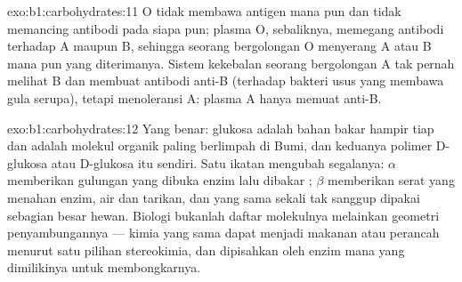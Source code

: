 \begin{solution}{exo:b1:carbohydrates:11}
 O tidak membawa antigen mana pun dan tidak memancing antibodi pada
siapa pun; plasma O, sebaliknya, memegang antibodi terhadap A maupun B,
sehingga seorang bergolongan O menyerang  A atau B mana pun yang
diterimanya. Sistem kekebalan seorang bergolongan A tak pernah melihat B
dan membuat antibodi anti-B (terhadap bakteri usus yang membawa gula
serupa), tetapi menoleransi A: plasma A hanya memuat anti-B.
\end{solution}

\begin{solution}{exo:b1:carbohydrates:12}
Yang benar: glukosa adalah bahan bakar hampir tiap  dan 
adalah molekul organik paling berlimpah di Bumi, dan keduanya polimer
D-glukosa atau D-glukosa itu sendiri. Satu ikatan mengubah segalanya:
$\alpha$ memberikan gulungan yang dibuka enzim lalu dibakar ;
$\beta$ memberikan serat yang menahan enzim, air dan tarikan, dan yang
sama sekali tak sanggup dipakai sebagian besar hewan. Biologi bukanlah
daftar molekulnya melainkan geometri penyambungannya --- kimia yang sama
dapat menjadi makanan atau perancah menurut satu pilihan stereokimia,
dan  dipisahkan oleh enzim mana yang dimilikinya untuk
membongkarnya.
\end{solution}

